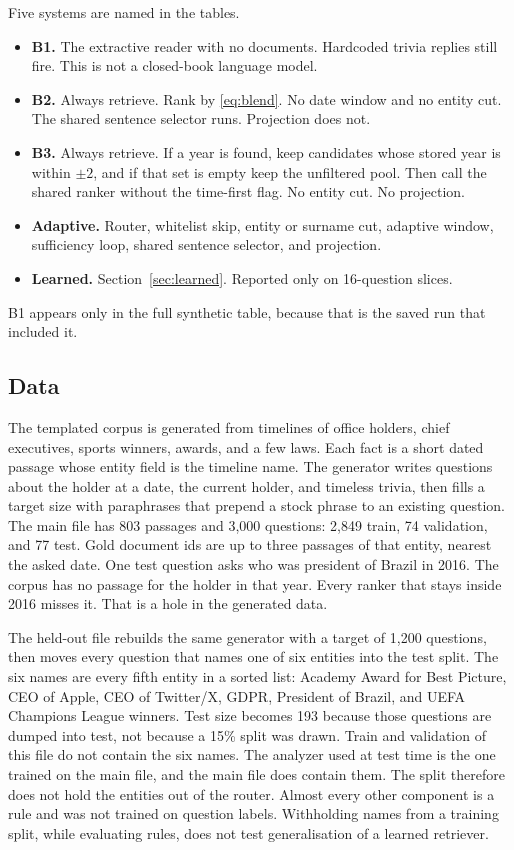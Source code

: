 \documentclass[11pt,letterpaper]{article}
\begin{document}
Five systems are named in the tables.
\begin{itemize}[leftmargin=1.4em]
  \item \textbf{B1.} The extractive reader with no documents. Hardcoded trivia replies still fire. This is not a closed-book language model.
  \item \textbf{B2.} Always retrieve. Rank by \eqref{eq:blend}. No date window and no entity cut. The shared sentence selector runs. Projection does not.
  \item \textbf{B3.} Always retrieve. If a year is found, keep candidates whose stored year is within $\pm 2$, and if that set is empty keep the unfiltered pool. Then call the shared ranker without the time-first flag. No entity cut. No projection.
  \item \textbf{Adaptive.} Router, whitelist skip, entity or surname cut, adaptive window, sufficiency loop, shared sentence selector, and projection.
  \item \textbf{Learned.} Section~\ref{sec:learned}. Reported only on 16-question slices.
\end{itemize}
B1 appears only in the full synthetic table, because that is the saved run that included it.

\subsection{Data}

The templated corpus is generated from timelines of office holders, chief executives, sports winners, awards, and a few laws.
Each fact is a short dated passage whose entity field is the timeline name.
The generator writes questions about the holder at a date, the current holder, and timeless trivia, then fills a target size with paraphrases that prepend a stock phrase to an existing question.
The main file has 803 passages and 3{,}000 questions: 2{,}849 train, 74 validation, and 77 test.
Gold document ids are up to three passages of that entity, nearest the asked date.
One test question asks who was president of Brazil in 2016.
The corpus has no passage for the holder in that year.
Every ranker that stays inside 2016 misses it.
That is a hole in the generated data.

The held-out file rebuilds the same generator with a target of 1{,}200 questions, then moves every question that names one of six entities into the test split.
The six names are every fifth entity in a sorted list: Academy Award for Best Picture, CEO of Apple, CEO of Twitter/X, GDPR, President of Brazil, and UEFA Champions League winners.
Test size becomes 193 because those questions are dumped into test, not because a 15\% split was drawn.
Train and validation of this file do not contain the six names.
The analyzer used at test time is the one trained on the main file, and the main file does contain them.
The split therefore does not hold the entities out of the router.
Almost every other component is a rule and was not trained on question labels.
Withholding names from a training split, while evaluating rules, does not test generalisation of a learned retriever.
\end{document}
